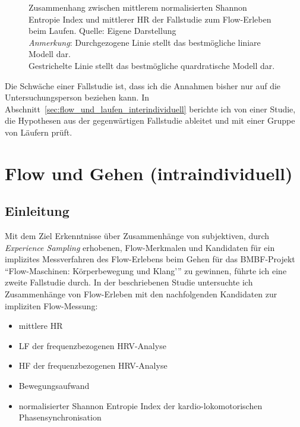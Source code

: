 \begin{figure}
	
	\caption[Zusammenhang zwischen mittlerem normalisierten Shannon Entropie Index und mittlerer HR (Fallstudie: Laufen)]{Zusammenhang zwischen mittlerem normalisierten Shannon Entropie Index und mittlerer HR der Fallstudie zum Flow-Erleben beim Laufen. Quelle: Eigene Darstellung \\\hspace{\textwidth}\emph{Anmerkung}: Durchgezogene Linie stellt das bestmögliche liniare Modell dar.\\ \hspace{\textwidth} Gestrichelte Linie stellt das bestmögliche quardratische Modell dar.}
	\label{fig:5_10_regression_extra}
\end{figure}

Die Schwäche einer Fallstudie ist, dass ich die Annahmen bisher nur auf die Untersuchungsperson beziehen kann. In Abschnitt~\ref{sec:flow_und_laufen_interindividuell} berichte ich von einer Studie, die Hypothesen aus der gegenwärtigen Fallstudie ableitet und mit einer Gruppe von Läufern prüft.

\section{Flow und Gehen (intraindividuell)}
\label{sec:flow_und_gehen_intraindividuell}
\subsection{Einleitung}
Mit dem Ziel Erkenntnisse über Zusammenhänge von subjektiven, durch \emph{Experience Sampling} erhobenen, Flow-Merkmalen und Kandidaten für ein implizites Messverfahren des Flow-Erlebens beim Gehen für das \acs{BMBF}-Projekt "`Flow-Maschinen: Körperbewegung und Klang'"' zu gewinnen, führte ich eine zweite Fallstudie durch. In der beschriebenen Studie untersuchte ich Zusammenhänge von Flow-Erleben mit den nachfolgenden Kandidaten zur impliziten Flow-Messung:
\begin{itemize}
	\item mittlere HR
	\item \ac{LF} der frequenzbezogenen \ac{HRV}-Analyse
	\item \ac{HF} der frequenzbezogenen \ac{HRV}-Analyse
	\item Bewegungsaufwand
	\item normalisierter Shannon Entropie Index der kardio-lokomotorischen Phasensynchronisation
\end{itemize}

